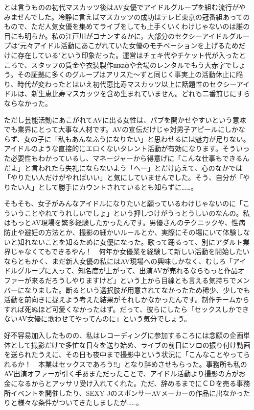 \documentclass[12pt,UTF8]{ctexbook}
\begin{document}
とは言うものの初代マスカッツ後はAV女優でアイドルグループを組む流行がやみませんでした。冷静に言えばマスカッツの成功はテレビ東京の冠番組あってのもので、ただ人気女優を集めてライブをしても上手くいくわけじゃないのは誰の目にも明らか。私の江戸川がコナンするかに，大部分のセクシーアイドルグループはʻ元々アイドル活動にあこがれていた女優のモチベーションを上げるためだけに存在しているʼという印象だった。運営はチェキ代やチケット代が入ったところで、スタッフの賃金や衣装製作шкафや会場のレンタルでもう大赤字でしょう。その証拠に多くのグループはアリスた〜ずと同じく事実上の活動休止に陥り、時代が変わったとはいえ初代恵比寿マスカッツ以上に話題性のセクシーアイドルは、新生恵比寿マスカッツを含め生まれていません。どれも二番煎じにすらならなかった。

ただし芸能活動にあこがれてAVに出る女性は、パブを開かせやすいという意味でも業界にとって大事な人材です。AVの宣伝だけじゃ対男子アピールにしかならず、女の子に「私もあんなふうになりたい」と思わせるには魅力が足りない。アイドルのような直接的にエロくないタレント活動が有効になります。そういった必要性もわかっているし、マネージャーから得意げに「こんな仕事もできるんだよ」と言われたら失礼にならないよう「へー」とだけ応えて、心のなかでは「やりたい人だけがやればいい」と気にしていませんでした。そう、自分が「やりたい人」として勝手にカウントされているとも知らずに……。

そもそも、女子がみんなアイドルになりたいと願っているわけじゃないのに「こういうことやれてうれしいでしょ」という押しつけがうっとうしいのなんの。私はもっとAV現場を繁多経験したかったんです。男優さんのテクニックや、性病防止や避妊の方法とか、撮影の細かいルールとか、実際にその場にいて体験しないと知れないことを知るために女優になった。歌って踊るって、別にアダルト業界じゃなくてもできるやん！　何年か女優業を経験して新しい活動を開始したいならともかく、まだ新人女優の私にはAV現場への興味しかなく、むしろ「アイドルグループに入って、知名度が上がって、出演AVが売れるならもっと作品オファーが来るだろうしやりますけど」という上から目線とも言える気持ちでメンバーになりました。断るという選択肢が用意されてなかったため稀少、少しでも活動を前向きに捉えよう考えた結果がそれしかなかったんです。制作チームからすれば死ぬほど可愛くなかったはず。だって、彼らにしたら「セックスしかできないAV女優に歌わせてやってんのに」という気分でしょう。

好不容易加入したものの、私はレコーディングに参加するころには念願の企画単体として撮影だけで多忙な日々を送り始め、ライブの前日にソロの振り付け動画を送られたうえに、その日も夜中まで撮影中という状況に「こんなことやってられるか！　本業はセックスであろう!!」となり辞めさせもらった。事務所も私のAV出演オファーが引く手あまただったことで、アイドル活動より撮影の方がお金になるからとアッサリ受け入れてくれた。ただ、辞めるまでにＣＤを売る事務所イベントを開催したり、SEXY-JのスポンサーAVメーカーの作品に出なかったりと様々な条件がついてきたしましたが……。
\end{document}
